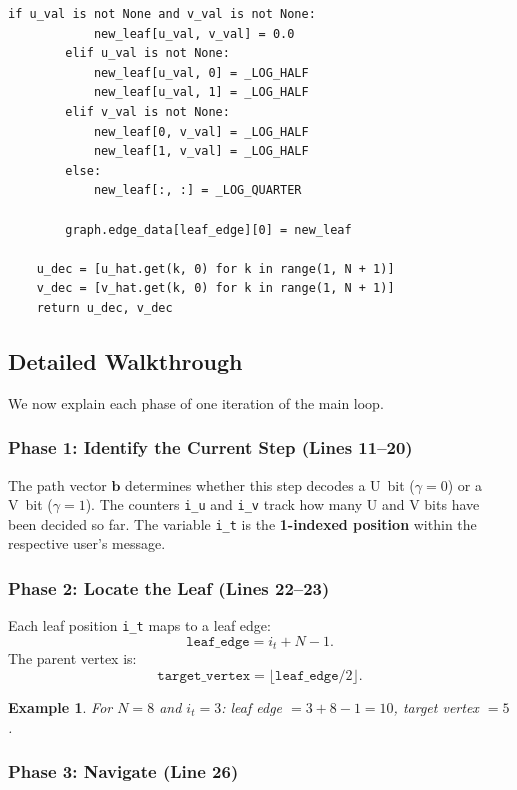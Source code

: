 \documentclass[11pt,a4paper]{article}
\newtheorem{example}{Example}[section]
\begin{document}
\begin{lstlisting}[caption={Main decoder loop (\texttt{\_decode\_general\_tensor})},label=lst:main_loop]
        if u_val is not None and v_val is not None:
            new_leaf[u_val, v_val] = 0.0
        elif u_val is not None:
            new_leaf[u_val, 0] = _LOG_HALF
            new_leaf[u_val, 1] = _LOG_HALF
        elif v_val is not None:
            new_leaf[0, v_val] = _LOG_HALF
            new_leaf[1, v_val] = _LOG_HALF
        else:
            new_leaf[:, :] = _LOG_QUARTER

        graph.edge_data[leaf_edge][0] = new_leaf

    u_dec = [u_hat.get(k, 0) for k in range(1, N + 1)]
    v_dec = [v_hat.get(k, 0) for k in range(1, N + 1)]
    return u_dec, v_dec
\end{lstlisting}

\subsection{Detailed Walkthrough}

We now explain each phase of one iteration of the main loop.

\subsubsection{Phase 1: Identify the Current Step (Lines 11--20)}

The path vector $\mathbf{b}$ determines whether this step decodes a U~bit ($\gamma = 0$) or a V~bit ($\gamma = 1$). The counters \texttt{i\_u} and \texttt{i\_v} track how many U and V bits have been decided so far. The variable \texttt{i\_t} is the \textbf{1-indexed position} within the respective user's message.

\subsubsection{Phase 2: Locate the Leaf (Lines 22--23)}

Each leaf position \texttt{i\_t} maps to a leaf edge:
\[
\texttt{leaf\_edge} = i_t + N - 1.
\]
The parent vertex is:
\[
\texttt{target\_vertex} = \lfloor \texttt{leaf\_edge} / 2 \rfloor.
\]

\begin{example}
For $N = 8$ and $i_t = 3$: leaf edge $= 3 + 8 - 1 = 10$, target vertex $= 5$.
\end{example}

\subsubsection{Phase 3: Navigate (Line 26)}
\end{document}
